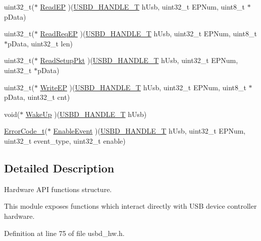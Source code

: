 \begin{DoxyCompactItemize}
\item 
uint32\+\_\+t($\ast$ \hyperlink{struct_u_s_b_d___h_w___a_p_i_a637042da839963e43c354ea184582080}{Read\+EP} )(\hyperlink{group___u_s_b_d___core_gafdbb2204d929cb9d75736bd2b42342ac}{U\+S\+B\+D\+\_\+\+H\+A\+N\+D\+L\+E\+\_\+T} h\+Usb, uint32\+\_\+t E\+P\+Num, uint8\+\_\+t $\ast$p\+Data)
\item 
uint32\+\_\+t($\ast$ \hyperlink{struct_u_s_b_d___h_w___a_p_i_a24326b43822367a3c7ce46ffe70c7087}{Read\+Req\+EP} )(\hyperlink{group___u_s_b_d___core_gafdbb2204d929cb9d75736bd2b42342ac}{U\+S\+B\+D\+\_\+\+H\+A\+N\+D\+L\+E\+\_\+T} h\+Usb, uint32\+\_\+t E\+P\+Num, uint8\+\_\+t $\ast$p\+Data, uint32\+\_\+t len)
\item 
uint32\+\_\+t($\ast$ \hyperlink{struct_u_s_b_d___h_w___a_p_i_ae8e43fb5e3029186b858971203735064}{Read\+Setup\+Pkt} )(\hyperlink{group___u_s_b_d___core_gafdbb2204d929cb9d75736bd2b42342ac}{U\+S\+B\+D\+\_\+\+H\+A\+N\+D\+L\+E\+\_\+T} h\+Usb, uint32\+\_\+t E\+P\+Num, uint32\+\_\+t $\ast$p\+Data)
\item 
uint32\+\_\+t($\ast$ \hyperlink{struct_u_s_b_d___h_w___a_p_i_a6565f11d655f825d13c9d197925fd1cb}{Write\+EP} )(\hyperlink{group___u_s_b_d___core_gafdbb2204d929cb9d75736bd2b42342ac}{U\+S\+B\+D\+\_\+\+H\+A\+N\+D\+L\+E\+\_\+T} h\+Usb, uint32\+\_\+t E\+P\+Num, uint8\+\_\+t $\ast$p\+Data, uint32\+\_\+t cnt)
\item 
void($\ast$ \hyperlink{struct_u_s_b_d___h_w___a_p_i_aaf44f0d6be8e7e49782addd889cc7b98}{Wake\+Up} )(\hyperlink{group___u_s_b_d___core_gafdbb2204d929cb9d75736bd2b42342ac}{U\+S\+B\+D\+\_\+\+H\+A\+N\+D\+L\+E\+\_\+T} h\+Usb)
\item 
\hyperlink{error_8h_a905255056c349318139d94aa4523d516}{Error\+Code\+\_\+t}($\ast$ \hyperlink{struct_u_s_b_d___h_w___a_p_i_a8556c919546438e9ca184c460cd1daa9}{Enable\+Event} )(\hyperlink{group___u_s_b_d___core_gafdbb2204d929cb9d75736bd2b42342ac}{U\+S\+B\+D\+\_\+\+H\+A\+N\+D\+L\+E\+\_\+T} h\+Usb, uint32\+\_\+t E\+P\+Num, uint32\+\_\+t event\+\_\+type, uint32\+\_\+t enable)
\end{DoxyCompactItemize}


\subsection{Detailed Description}
Hardware A\+PI functions structure.

This module exposes functions which interact directly with U\+SB device controller hardware. 

Definition at line 75 of file usbd\+\_\+hw.\+h.



